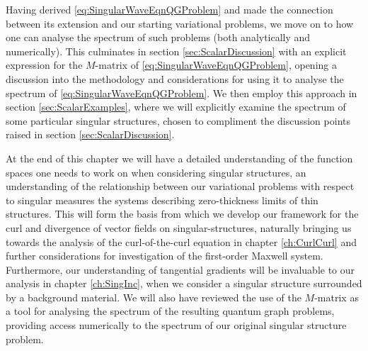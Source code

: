Having derived \eqref{eq:SingularWaveEqnQGProblem} and made the connection between its extension and our starting variational problems, we move on to how one can analyse the spectrum of such problems (both analytically and numerically).
This culminates in section \ref{sec:ScalarDiscussion} with an explicit expression for the $M$-matrix of \eqref{eq:SingularWaveEqnQGProblem}, opening a discussion into the methodology and considerations for using it to analyse the spectrum of \eqref{eq:SingularWaveEqnQGProblem}.
We then employ this approach in section \ref{sec:ScalarExamples}, where we will explicitly examine the spectrum of some particular singular structures, chosen to compliment the discussion points raised in section \ref{sec:ScalarDiscussion}.

At the end of this chapter we will have a detailed understanding of the function spaces one needs to work on when considering singular structures, an understanding of the relationship between our variational problems with respect to singular measures the systems describing zero-thickness limits of thin structures.
This will form the basis from which we develop our framework for the curl and divergence of vector fields on singular-structures, naturally bringing us towards the analysis of the curl-of-the-curl equation in chapter \ref{ch:CurlCurl} and further considerations for investigation of the first-order Maxwell system.
Furthermore, our understanding of tangential gradients will be invaluable to our analysis in chapter \ref{ch:SingInc}, when we consider a singular structure surrounded by a background material.
We will also have reviewed the use of the $M$-matrix as a tool for analysing the spectrum of the resulting quantum graph problems, providing access numerically to the spectrum of our original singular structure problem.
